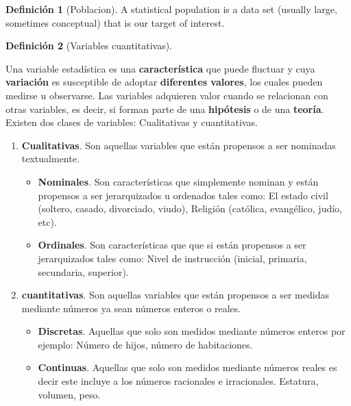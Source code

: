 \documentclass[
  11pt,
]{krantz}
\theoremstyle{definition}
\newtheorem{definition}{Definición}[chapter]
\theoremstyle{definition}
\theoremstyle{definition}
\theoremstyle{definition}
\theoremstyle{remark}
\begin{document}
\begin{definition}[Poblacion]
\protect\hypertarget{def:poblacion}{}\label{def:poblacion}A statistical population is a data set (usually large, sometimes conceptual) that is our target of interest.
\end{definition}

\begin{definition}[Variables cuantitativas]
\protect\hypertarget{def:variable2}{}\label{def:variable2}

Una variable estadística es una \textbf{característica} que puede fluctuar y cuya \textbf{variación} es susceptible de adoptar \textbf{diferentes valores}, los cuales pueden medirse u observarse. Las variables adquieren valor cuando se relacionan con otras variables, es decir, si forman parte de una \textbf{hipótesis} o de una \textbf{teoría}. Existen dos clases de variables: Cualitativas y cuantitativas.

\begin{enumerate}
\def\labelenumi{\arabic{enumi}.}
\item
  \textbf{Cualitativas}. Son aquellas variables que están propensos a ser nominadas textualmente.

  \begin{itemize}
  \item
    \textbf{Nominales}. Son características que simplemente nominan y están propensos a ser jerarquizados u ordenados tales como: El estado civil (soltero, casado, divorciado, viudo), Religión (católica, evangélico, judío, etc).
  \item
    \textbf{Ordinales}. Son características que que si están propensos a ser jerarquizados tales como: Nivel de instrucción (inicial, primaria, secundaria, superior).
  \end{itemize}
\item
  \textbf{cuantitativas}. Son aquellas variables que están propensos a ser medidas mediante números ya sean números enteros o reales.

  \begin{itemize}
  \item
    \textbf{Discretas}. Aquellas que solo son medidos mediante números enteros por ejemplo: Número de hijos, número de habitaciones.
  \item
    \textbf{Continuas}. Aquellas que solo son medidos mediante números reales es decir este incluye a los números racionales e irracionales. Estatura, volumen, peso.
  \end{itemize}
\end{enumerate}

\end{definition}
\end{document}
